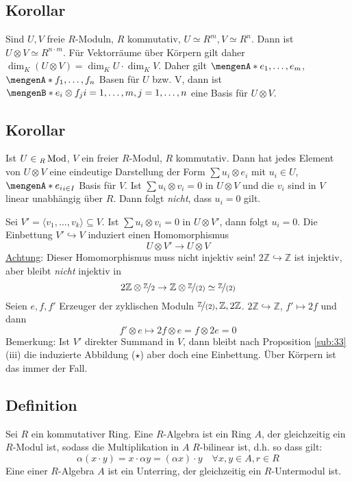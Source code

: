 \subsection[Korollar: Tensorprodukt von freien Moduln]{Korollar} %
\label{sub:36}
Sind $U,V$ freie $R$-Moduln, $R$ kommutativ, $U \simeq R^m, V \simeq R^n$. Dann ist $U \otimes V \simeq R^{n \cdot m}$.
Für Vektorräume über Körpern gilt daher $\dim_K(U \otimes V)= \dim_K U \cdot \dim_K V$. Daher gilt $\set{e_1, \ldots , e_m}$, $ \set{f_1, \ldots , f_n}$ Basen für $U$ bzw. 
V, dann ist $\set[e_i \otimes f_j]{i=1,\ldots ,m , j=1,\ldots ,n} $ eine Basis für $U \otimes V$.

\subsection[Korollar: Darstellung der Elemente eines Tensorprodukts mit freiem Modul]{Korollar} %
\label{sub:37}
Ist $U \in {_R \Mod}$, $V$ ein freier $R$-Modul, $R$ kommutativ. Dann hat jedes Element von $U \otimes V$ eine eindeutige Darstellung der Form $\sum u_i \otimes e_i$ mit
$u_i \in U$, $\set{e_i}_{i \in I}$ Basis für $V$.
Ist $\sum u_i \otimes v_i = 0$ in $U \otimes V$ und die $v_i$ sind in $V$ linear unabhängig über $R$. Dann folgt \emph{nicht}, dass $u_i =0$ gilt. 

Sei $V' = \langle v_1, \ldots , v_k \rangle \subseteq V$. Ist $\sum u_i \otimes v_i = 0$ in $U \otimes V'$, dann folgt $u_i=0$. Die Einbettung $V' \hookrightarrow V$
induziert einen Homomorphismus 
\[
	U \otimes V' \to U \otimes V \tag*{$\star$}
\]
\uline{Achtung}: Dieser Homomorphismus muss nicht injektiv sein!
$2 \mathds{Z} \hookrightarrow \mathds{Z}$ ist injektiv, aber bleibt \emph{nicht} injektiv in
\[
	2 \mathds{Z} \otimes \nicefrac{\mathds{Z}}{2} \to \mathds{Z} \otimes \nicefrac{\mathds{Z}}{(2)} \simeq \nicefrac{\mathds{Z}}{(2)}
\]
Seien $e, f, f'$ Erzeuger der zyklischen Moduln $\nicefrac{\mathds{Z}}{(2)}, \mathds{Z}, 2 \mathds{Z}$. $2 \mathds{Z} \hookrightarrow \mathds{Z}$, $f' \mapsto 2 f$ und dann
\[
	f' \otimes  e \mapsto 2 f \otimes e = f \otimes 2 e  = 0
\]
Bemerkung: Ist $V'$ direkter Summand in $V$, dann bleibt nach Proposition \ref{sub:33} (iii) die induzierte Abbildung ($\star$) aber doch eine Einbettung. Über Körpern ist 
das immer der Fall.

\subsection[Definition: Algebra]{Definition} %
\label{sub:38}
Sei $R$ ein kommutativer Ring. Eine $R$-Algebra ist ein Ring $A$, der gleichzeitig ein $R$-Modul ist, sodass die Multiplikation in $A$ $R$-bilinear ist, d.h. so dass gilt:
\[
	\alpha (x \cdot y) = x \cdot \alpha y = (\alpha x) \cdot y \quad \forall x,y \in A, r \in R
\]
Eine  einer $R$-Algebra $A$ ist ein Unterring, der gleichzeitig ein $R$-Untermodul ist.

